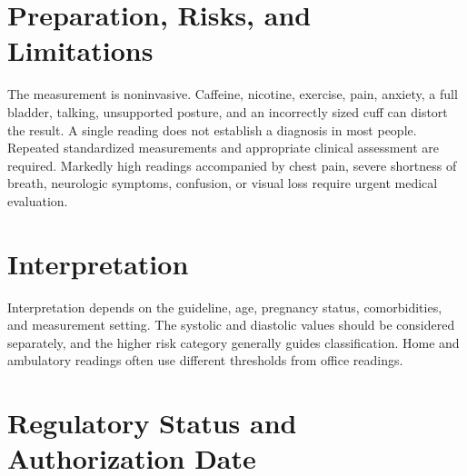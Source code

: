 \section*{Preparation, Risks, and Limitations}
The measurement is noninvasive. Caffeine, nicotine, exercise, pain, anxiety, a full bladder, talking, unsupported posture, and an incorrectly sized cuff can distort the result. A single reading does not establish a diagnosis in most people. Repeated standardized measurements and appropriate clinical assessment are required. Markedly high readings accompanied by chest pain, severe shortness of breath, neurologic symptoms, confusion, or visual loss require urgent medical evaluation.

\section*{Interpretation}
Interpretation depends on the guideline, age, pregnancy status, comorbidities, and measurement setting. The systolic and diastolic values should be considered separately, and the higher risk category generally guides classification. Home and ambulatory readings often use different thresholds from office readings.


\section*{Regulatory Status and Authorization Date}

\clearpage
